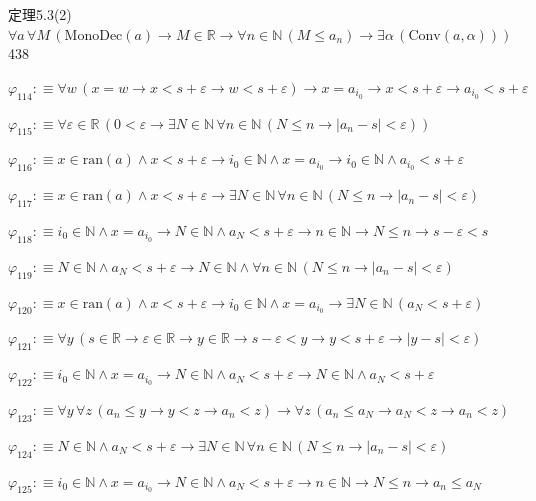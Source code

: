 \begin{fullproof}{定理5.3(2)}{$\forall a\,\forall M\,(\mathrm{MonoDec}(a) \to M \in \mathbb{R} \to \forall n \in \mathbb{N}\,(M \leq a_{n}) \to \exists \alpha\,(\mathrm{Conv}(a,\alpha)))$}{438}
\begin{abbrevlist}
\item $\varphi_{114} :\equiv \forall w\,(x = w \to x < s + \varepsilon \to w < s + \varepsilon) \to x = a_{i_{0}} \to x < s + \varepsilon \to a_{i_{0}} < s + \varepsilon$
\item $\varphi_{115} :\equiv \forall \varepsilon \in \mathbb{R}\,(0 < \varepsilon \to \exists N \in \mathbb{N}\,\forall n \in \mathbb{N}\,(N \leq n \to \lvert a_{n} - s \rvert < \varepsilon))$
\item $\varphi_{116} :\equiv x \in \mathrm{ran}(a) \land x < s + \varepsilon \to i_{0} \in \mathbb{N} \land x = a_{i_{0}} \to i_{0} \in \mathbb{N} \land a_{i_{0}} < s + \varepsilon$
\item $\varphi_{117} :\equiv x \in \mathrm{ran}(a) \land x < s + \varepsilon \to \exists N \in \mathbb{N}\,\forall n \in \mathbb{N}\,(N \leq n \to \lvert a_{n} - s \rvert < \varepsilon)$
\item $\varphi_{118} :\equiv i_{0} \in \mathbb{N} \land x = a_{i_{0}} \to N \in \mathbb{N} \land a_{N} < s + \varepsilon \to n \in \mathbb{N} \to N \leq n \to s - \varepsilon < s$
\item $\varphi_{119} :\equiv N \in \mathbb{N} \land a_{N} < s + \varepsilon \to N \in \mathbb{N} \land \forall n \in \mathbb{N}\,(N \leq n \to \lvert a_{n} - s \rvert < \varepsilon)$
\item $\varphi_{120} :\equiv x \in \mathrm{ran}(a) \land x < s + \varepsilon \to i_{0} \in \mathbb{N} \land x = a_{i_{0}} \to \exists N \in \mathbb{N}\,(a_{N} < s + \varepsilon)$
\item $\varphi_{121} :\equiv \forall y\,(s \in \mathbb{R} \to \varepsilon \in \mathbb{R} \to y \in \mathbb{R} \to s - \varepsilon < y \to y < s + \varepsilon \to \lvert y - s \rvert < \varepsilon)$
\item $\varphi_{122} :\equiv i_{0} \in \mathbb{N} \land x = a_{i_{0}} \to N \in \mathbb{N} \land a_{N} < s + \varepsilon \to N \in \mathbb{N} \land a_{N} < s + \varepsilon$
\item $\varphi_{123} :\equiv \forall y\,\forall z\,(a_{n} \leq y \to y < z \to a_{n} < z) \to \forall z\,(a_{n} \leq a_{N} \to a_{N} < z \to a_{n} < z)$
\item $\varphi_{124} :\equiv N \in \mathbb{N} \land a_{N} < s + \varepsilon \to \exists N \in \mathbb{N}\,\forall n \in \mathbb{N}\,(N \leq n \to \lvert a_{n} - s \rvert < \varepsilon)$
\item $\varphi_{125} :\equiv i_{0} \in \mathbb{N} \land x = a_{i_{0}} \to N \in \mathbb{N} \land a_{N} < s + \varepsilon \to n \in \mathbb{N} \to N \leq n \to a_{n} \leq a_{N}$

\end{abbrevlist}
\end{fullproof}
